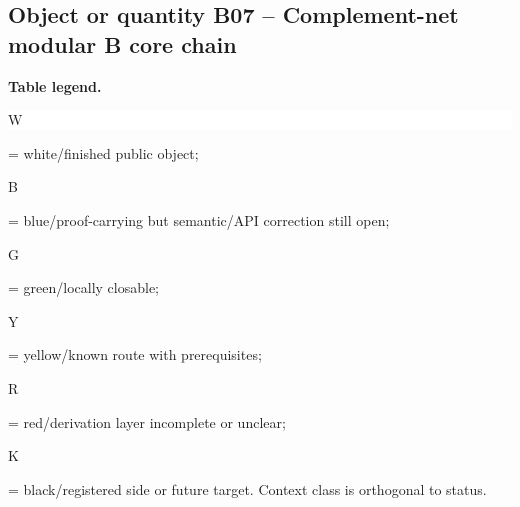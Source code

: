 \subsection*{Object or quantity B07 -- Complement-net modular B core chain}
\hypertarget{objproof:B07}{}
\par\smallskip\noindent\begin{minipage}{0.99\linewidth}\footnotesize\raggedright\textbf{Table legend.} \colorbox{white}{\strut W} = white/finished public object; \colorbox{cyan!20}{\strut B} = blue/proof-carrying but semantic/API correction still open; \colorbox{green!18}{\strut G} = green/locally closable; \colorbox{yellow!25}{\strut Y} = yellow/known route with prerequisites; \colorbox{red!20}{\strut R} = red/derivation layer incomplete or unclear; \colorbox{black!18}{\strut K} = black/registered side or future target. Context class is orthogonal to status.\end{minipage}\par\vspace{0.25em}
